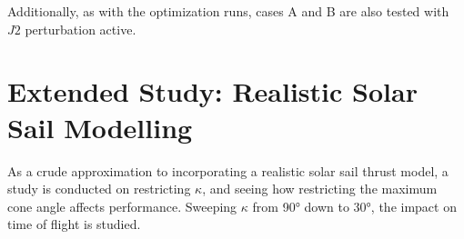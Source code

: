 Additionally, as with the optimization runs, cases A and B are also tested with \(J2\) perturbation active.

\section{Extended Study: Realistic Solar Sail Modelling}
As a crude approximation to incorporating a realistic solar sail thrust model, a study is conducted on restricting \(\kappa\), and seeing how restricting the maximum cone angle affects performance. Sweeping \(\kappa\) from \ang{90} down to \ang{30}, the impact on time of flight is studied.

